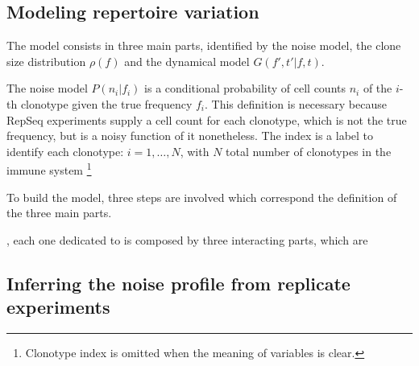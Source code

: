 \documentclass[a4paper]{article}
\begin{document}



\subsection{Modeling repertoire variation}
The model consists in three main parts, identified by the noise model, the clone size distribution $\rho(f)$ and the dynamical model $G(f', t'|f, t)$.


The noise model $P(n_i|f_i)$ is a conditional probability of cell counts $n_i$ of the $i$-th clonotype given the true frequency $f_i$. This definition is necessary because RepSeq experiments supply a cell count for each clonotype, which is not the true frequency, but is a noisy function of it nonetheless.
The index is a label to identify each clonotype: $i = 1, \dots, N$, with $N$ total number of clonotypes in the immune system%
%
\footnote{Clonotype index is omitted when the meaning of variables is clear.}




To build the model, three steps are involved which correspond the definition %
of the three main parts.





, each one dedicated to is composed by three interacting parts, which are 


\subsection{Inferring the noise profile from replicate experiments}

\end{document}
